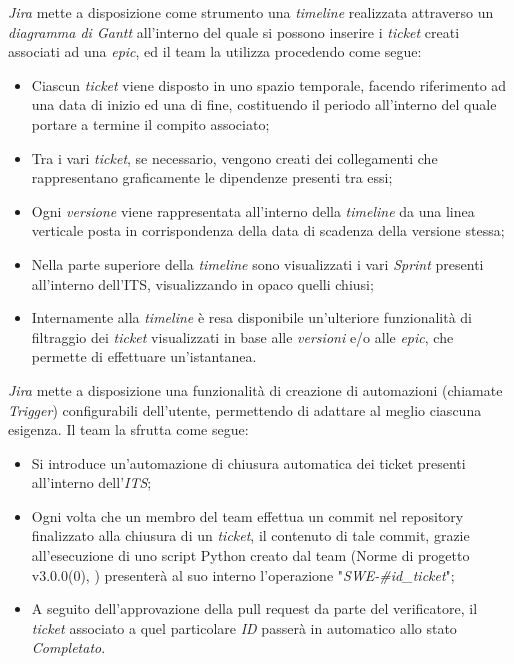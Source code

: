 \documentclass[10pt, a4paper]{article}
\begin{document}
\textit{Jira} mette a disposizione come strumento una \textit{timeline} realizzata attraverso un \textit{diagramma di Gantt\pg} all'interno del quale si possono inserire i \textit{ticket}
creati associati ad una \textit{epic}, ed il team la utilizza procedendo come segue:
\begin{itemize}
    \item Ciascun \textit{ticket} viene disposto in uno spazio temporale, facendo riferimento ad una data di inizio ed una di fine, costituendo il periodo
    all'interno del quale portare a termine il compito associato;
    \item Tra i vari \textit{ticket}, se necessario, vengono creati dei collegamenti che rappresentano graficamente 
    le dipendenze presenti tra essi;
    \item Ogni \textit{versione} viene rappresentata all'interno della \textit{timeline} da una linea verticale posta in corrispondenza della data di scadenza
    della versione stessa;
    \item Nella parte superiore della \textit{timeline} sono visualizzati i vari \textit{Sprint} presenti all'interno dell'ITS, visualizzando in opaco quelli chiusi;
    \item Internamente alla \textit{timeline} è resa disponibile un'ulteriore funzionalità di filtraggio dei \textit{ticket} visualizzati in base alle \textit{versioni} e/o alle \textit{epic},
    che permette di effettuare un'istantanea.
\end{itemize}

 \textit{Jira} mette a disposizione una funzionalità di creazione di automazioni (chiamate \textit{Trigger}) configurabili dell'utente, permettendo di adattare al meglio ciascuna esigenza. Il team la sfrutta come segue:
\begin{itemize}
    \item Si introduce un'automazione di chiusura automatica dei ticket presenti all'interno dell'\textit{ITS};
    \item Ogni volta che un membro del team 
    effettua un commit nel repository finalizzato alla chiusura di un \textit{ticket}, il contenuto di tale commit, grazie all'esecuzione di uno script Python creato dal team (Norme di progetto v3.0.0(0), )
    presenterà al suo interno l'operazione "\textit{SWE-\#id\_ticket}";
    \item A seguito dell'approvazione della pull request da parte del verificatore, il \textit{ticket} associato a quel particolare \textit{ID} passerà in automatico
    allo stato \textit{Completato}.
\end{itemize}
\end{document}
